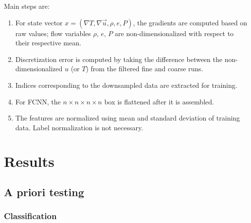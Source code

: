 \documentclass{article}
\begin{document}
Main steps are:
\begin{enumerate}
    \item For state vector $x = (\nabla T, \nabla \vec{u}, \rho, e, P)$, the gradients are computed based on raw values; flow variables $\rho,\, e,\, P$ are non-dimensionalized with respect to their respective mean.
    \item Discretization error is computed by taking the difference between the non-dimensionalized $u$ (or $T$) from the filtered fine and coarse runs.
    \item Indices corresponding to the downsampled data are extracted for training.
    \item For FCNN, the $n \times n \times n \times n$ box is flattened after it is assembled. 
    \item The features are normalized using mean and standard deviation of training data. Label normalization is not necessary.
\end{enumerate}


\section{Results}

\subsection{A priori testing}

\subsubsection{Classification}
\end{document}
